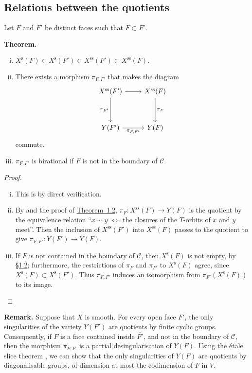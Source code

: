 \documentclass{article}
\newenvironment{itenv}[1]
  {\phantomsection\par\medskip\noindent\textbf{#1.}\itshape}
  {\medskip}
\newenvironment{rmenv}[1]
  {\phantomsection\par\medskip\noindent\textbf{#1.}\rmfamily}
  {\medskip}
\newcommand{\s}{\mathrm{s}}
\renewcommand{\ss}{\mathrm{ss}}
\newcommand{\oldpage}[1]{\marginpar{\footnotesize$\Big\vert$ \textit{p.~#1}}}
\begin{document}
\subsection{Relations between the quotients}
\label{1.4}

Let $F$ and $F'$ be distinct faces such that $F\subset\overline{F'}$.

\begin{itenv}{Theorem}
  \begin{enumerate}[(i)]
    \item $X^\s(F) \subset X^\s(F') \subset X^\ss(F') \subset X^\ss(F)$.
    \item There exists a morphism $\pi_{F,F'}$ that makes the diagram
      \[
        \begin{tikzcd}[row sep=huge]
          X^\ss(F') \rar \dar[swap,"\pi_{F'}"]
          & X^\ss(F) \dar["\pi_F"]
        \\Y(F') \rar[swap,"\pi_{F,F'}"]
          & Y(F)
        \end{tikzcd}
      \]
      commute.
    \item $\pi_{F,F'}$ is birational if $F$ is not in the boundary of $\mathcal{C}$.
  \end{enumerate}
\end{itenv}

\oldpage{515}
\begin{proof}
  \begin{enumerate}[(i)]
    \item This is by direct verification.
    \item By \cite[1.11]{MF} and the proof of \hyperref[1.2-theorem]{Theorem~1.2}, $\pi_F\colon X^\ss(F)\to Y(F)$ is the quotient by the equivalence relation ``$x\sim y$ $\iff$ the closures of the $T$-orbits of $x$ and $y$ meet''.
      Then the inclusion of $X^\ss(F')$ into $X^\ss(F)$ passes to the quotient to give $\pi_{F,F'}\colon Y(F')\to Y(F)$.
    \item If $F$ is not contained in the boundary of $\mathcal{C}$, then $X^\s(F)$ is not empty, by \hyperref[1.2]{\S1.2};
      furthermore, the restrictions of $\pi_F$ and $\pi_{F'}$ to $X^\s(F)$ agree, since $X^\s(F)\subset X^\s(F')$.
      Thus $\pi_{F,F'}$ induces an isomorphism from $\pi_{F'}(X^\s(F))$ to its image.
  \end{enumerate}
\end{proof}

\begin{rmenv}{Remark}
  Suppose that $X$ is smooth.
  For every open face $F'$, the only singularities of the variety $Y(F')$ are quotients by finite cyclic groups.
  Consequently, if $F$ is a face contained inside $\overline{F'}$, and not in the boundary of $\mathcal{C}$, then the morphism $\pi_{F,F'}$ is a partial desingularisation of $Y(F)$.
  Using the \'{e}tale slice theorem \cite[III.1]{Lun}, we can show that the only singularities of $Y(F)$ are quotients by diagonalisable groups, of dimension at most the codimension of $F$ in $V$.
\end{rmenv}
\end{document}
